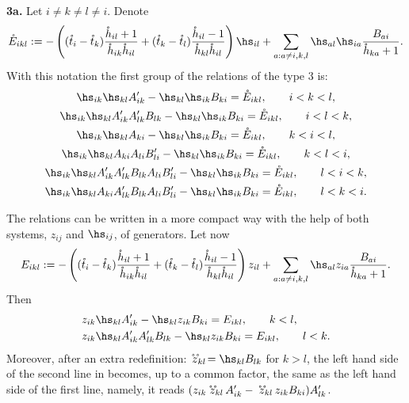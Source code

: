 \documentclass[11pt]{article}
\def\nplus{\mathfrak{n}}\def\nn{\nonumber}\def\nin{\noindent}
\def\s{z}\def\S{\mathrm {S}}\def\si{\sigma}\def\Sp{\S^{\nplus}}\def\sy{\acute{\sigma}}\def\th{\mathring{h}}
\def\tphi{A}\def\tpsi{A'}\def\tphiplus{B}\def\tpsiminus{B'}\def\ttphi{B}\def\ttpsi{B'}\def\ts{\hskip1pt}\def\tts{\hskip.5pt}
\def\tt{\mathring{t}}\def\U{\mathrm{U}}\def\Uh{\overline{\U}(\h)}\def\UU{\overline{\U}}\def\UUh{{\cal{D}}(\h)}
\numberwithin{equation}{section}
\begin{document}
{\bf 3a.} Let $i\neq k\neq l\neq i$. Denote
\begin{gather*}
\mathring{E}_{ikl}:=-\left((\tt_i-\tt_k) \frac{\th_{il}+1}{\th_{ik}\th_{il}}+(\tt_k-\tt_l) \frac{\th_{il}-1}{\th_{kl}\th_{il}}\right)\hs_{il}+\sum_{a:a\neq i,k,l}
\hs_{al}\hs_{ia} \frac{\ttphi_{ai}}{\th_{ka}+1} .
\end{gather*}
With this notation the f\/irst group of the relations of the type 3 is:
\begin{gather}\notag\hs_{ik}\hs_{kl}\tpsi_{ik} -\hs_{kl}\hs_{ik}\ttphi_{ki}
=\mathring{E}_{ikl} , \qquad i<k<l ,\\   \notag
\hs_{ik}\hs_{kl}\tpsi_{ik}\tpsi_{lk}\ttphi_{lk} -\hs_{kl}\hs_{ik}\ttphi_{ki}
=\mathring{E}_{ikl}  , \qquad i<l<k ,\\
\label{relation3}
\hs_{ik}\hs_{kl}\tphi_{ki} -\hs_{kl}\hs_{ik}\ttphi_{ki}=\mathring{E}_{ikl} , \qquad  k<i<l ,\\
\notag \hs_{ik}\hs_{kl}\tphi_{ki}\tphi_{li}\ttpsi_{li} -\hs_{kl}\hs_{ik}\ttphi_{ki}
=\mathring{E}_{ikl}  ,\qquad  k<l<i ,\\
\notag \hs_{ik}\hs_{kl}\tpsi_{ik}\tpsi_{lk}\ttphi_{lk}\tphi_{li}\ttpsi_{li}-\hs_{kl}\hs_{ik}\ttphi_{ki}
 =\mathring{E}_{ikl}  , \qquad l<i<k , \\  \notag
\hs_{ik}\hs_{kl}\tphi_{ki}\tpsi_{lk}\ttphi_{lk}\tphi_{li}\ttpsi_{li}
-\hs_{kl}\hs_{ik}\ttphi_{ki}=\mathring{E}_{ikl} , \qquad l<k<i .
\end{gather}

The relations  can be written in a more compact way with the help of both systems, $\s_{ij}$ and $\hs_{ij}$, of generators. Let now
\begin{gather*}
E_{ikl}:=-\left((\tt_i-\tt_k) \frac{\th_{il}+1}{\th_{ik}\th_{il}}+(\tt_k-\tt_l) \frac{\th_{il}-1}{\th_{kl}\th_{il}}\right)
\s_{il}+\sum_{a:a\neq i,k,l}
\hs_{al}\s_{ia} \frac{\ttphi_{ai}}{\th_{ka}+1} .
\end{gather*}
Then
\begin{gather}
\begin{split}
& \s_{ik}\hs_{kl}\tpsi_{ik} -\hs_{kl}\s_{ik}\ttphi_{ki}=E_{ikl} ,\qquad k<l,\\ %
& \s_{ik}\hs_{kl}\tpsi_{ik}\tpsi_{lk}\ttphi_{lk} -\hs_{kl}\s_{ik}\ttphi_{ki}=E_{ikl} ,\qquad l<k .
\end{split}
\label{shfo3a}
\end{gather}
Moreover, after an extra redef\/inition: $\!\mathring{\hspace{.1cm}z}_{kl}\!\!\!\!\!\!\mathring{\phantom{z}}\ =\hs_{kl}\ttphi_{lk}$ for $k>l$, the left hand side of the
second line in  becomes, up to a common factor, the same as the left hand side of the f\/irst line, namely, it reads $(\s_{ik}
\mathring{\hspace{.1cm}z}_{kl}\!\!\!\!\!\!\mathring{\phantom{z}}\ \ \tpsi_{ik} -\mathring{\hspace{.1cm}z}_{kl}\!\!\!\!\!\!\mathring{\phantom{z}}\ \ \s_{ik}\ttphi_{ki})
\tpsi_{lk}$.
\end{document}
